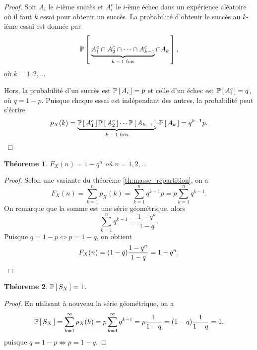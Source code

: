\documentclass[11pt]{article}
\renewcommand\P[1]{%
	\ensuremath{%
		\mathbb{P}\left[\,#1\,\right]%
	}%
}%
\newtheorem{theoreme}{Théoreme}[section]
\begin{document}
\begin{proof}
	Soit $A_i$ le $i$-ième succès et $A_i^c$ le $i$-ème échec dans un
	expérience aléatoire où il faut $k$ essai pour obtenir un succès. La
	probabilité d'obtenir le succès au $k$-ième essai est donnée par
	\begin{equation*}
		\P{
			\underbrace{A_1^c\cap A_2^c\cap\cdots\cap A_{k-1}^c}_
			\text{$k-1$ fois}\cap A_k
		},
	\end{equation*}
	où $k=1,2,\dots$

	Hors, la probabilité d'un succès est $\P{A_i}=p$ et celle d'un échec
	est $\P{A_i^c}=q$, où $q=1-p$. Puisque chaque essai est indépendant des
	autres, la probabilité peut s'écrire
	\begin{equation*}
		p_X(k)=
		\underbrace{\P{A_1^c}\P{A_2^c}\cdots\P{A_{k-1}}}_\text{$k-1$ fois}
		\cdot\P{A_k}=q^{k-1}p.\qedhere
	\end{equation*}
\end{proof}

\begin{theoreme}\label{th:repartition_geo}
	$F_X(n)=1-q^n$ où $n=1,2,\dots$
\end{theoreme}

\begin{proof}
	Selon une variante du théorème \ref{th:masse_repartition}, on a
	\begin{equation*}
		F_X(n)=\sum_{k=1}^np_X(k)=\sum_{k=1}^nq^{k-1}p=p\sum_{k=1}^nq^{k-1}.
	\end{equation*}
	On remarque que la somme est une série géométrique, alors
	\begin{equation*}
		\sum_{k=1}^nq^{k-1}=\frac{1-q^n}{1-q}.
	\end{equation*}
	Puisque $q=1-p\Leftrightarrow p=1-q$, on obtient
	\begin{equation*}
		F_X(n)=(1-q)\frac{1-q^n}{1-q}=1-q^n.\qedhere
	\end{equation*}
\end{proof}

\begin{theoreme}
	$\P{S_X}=1$.
\end{theoreme}

\begin{proof}
	En utilisant à nouveau la série géométrique, on a
	\begin{equation*}
		\P{S_X}
		=\sum_{k=1}^\infty p_X(k)
		=p\sum_{k=1}^\infty q^{k-1}
		=p\frac{1}{1-q}
		=(1-q)\frac{1}{1-q}
		=1,
	\end{equation*}
	puisque $q=1-p\Leftrightarrow p=1-q$.
\end{proof}
\end{document}
